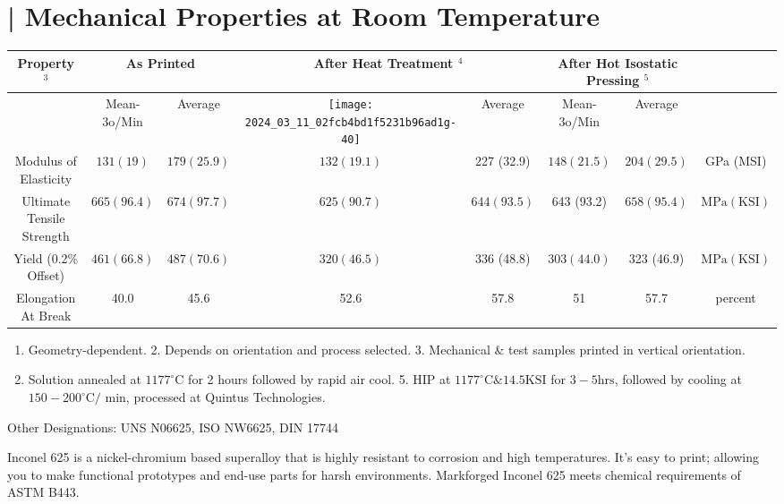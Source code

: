 \documentclass[10pt]{article}
\begin{document}
\section*{| Mechanical Properties at Room Temperature}
\begin{center}
\begin{tabular}{|c|c|c|c|c|c|c|c|}
\hline
\multirow[b]{2}{*}{Property $^{3}$} & \multicolumn{2}{|c|}{As Printed} & \multicolumn{2}{|c|}{After Heat Treatment ${ }^{4}$} & \multicolumn{2}{|c|}{After Hot Isostatic Pressing ${ }^{5}$} &  \\
\hline
 & Mean-3o/Min & Average & \texttt{[image: 2024\_03\_11\_02fcb4bd1f5231b96ad1g-40]}
 & Average & Mean-3o/Min & Average &  \\
\hline
Modulus of Elasticity & $131(19)$ & $179(25.9)$ & $132(19.1)$ & 227 (32.9) & $148(21.5)$ & $204(29.5)$ & GPa (MSI) \\
\hline
Ultimate Tensile Strength & $665(96.4)$ & $674(97.7)$ & $625(90.7)$ & $644(93.5)$ & 643 (93.2) & $658(95.4)$ & $\mathrm{MPa}(\mathrm{KSI})$ \\
\hline
Yield (0.2\% Offset) & $461(66.8)$ & $487(70.6)$ & $320(46.5)$ & 336 (48.8) & $303(44.0)$ & 323 (46.9) & $\mathrm{MPa}(\mathrm{KSI})$ \\
\hline
Elongation At Break & 40.0 & 45.6 & 52.6 & 57.8 & 51 & 57.7 & percent \\
\hline
\end{tabular}
\end{center}

\begin{enumerate}
  \item Geometry-dependent. 2. Depends on orientation and process selected. 3. Mechanical \& test samples printed in vertical orientation.

  \item Solution annealed at $1177^{\circ} \mathrm{C}$ for 2 hours followed by rapid air cool. 5. HIP at $1177^{\circ} \mathrm{C} \& 14.5 \mathrm{KSI}$ for $3-5 \mathrm{hrs}$, followed by cooling at $150-200^{\circ} \mathrm{C} /$ min, processed at Quintus Technologies.

\end{enumerate}

Other Designations: UNS N06625, ISO NW6625, DIN 17744

Inconel 625 is a nickel-chromium based superalloy that is highly resistant to corrosion and high temperatures. It's easy to print; allowing you to make functional prototypes and end-use parts for harsh environments. Markforged Inconel 625 meets chemical requirements of ASTM B443.
\end{document}
